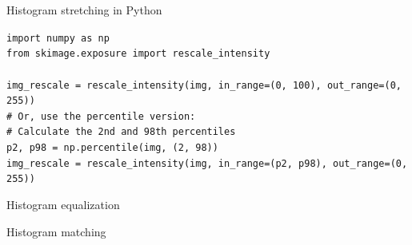 \documentclass[9pt, aspectratio=169]{beamer}
\begin{document}
\begin{frame}
{Histogram stretching in Python}
\begin{codebox}
\texttt{import numpy as np\\
from skimage.exposure import rescale\_intensity\\
\\
img\_rescale = rescale\_intensity(img, in\_range=(0, 100), out\_range=(0, 255))\\
\pause
\# Or, use the percentile version:\\
\# Calculate the 2nd and 98th percentiles\\
p2, p98 = np.percentile(img, (2, 98))\\
img\_rescale = rescale\_intensity(img, in\_range=(p2, p98), out\_range=(0, 255))
}
\end{codebox}
\end{frame}

\begin{frame}
    {Histogram equalization}
\end{frame}

\begin{frame}
    {Histogram matching}
\end{frame}
\end{document}
